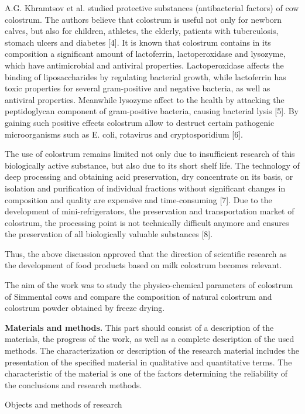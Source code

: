 A.G. Khramtsov et al. studied protective substances (antibacterial
factors) of cow colostrum. The authors believe that colostrum is useful
not only for newborn calves, but also for children, athletes, the
elderly, patients with tuberculosis, stomach ulcers and diabetes
{[}4{]}. It is known that colostrum contains in its composition a
significant amount of lactoferrin, lactoperoxidase and lysozyme, which
have antimicrobial and antiviral properties. Lactoperoxidase affects the
binding of liposaccharides by regulating bacterial growth, while
lactoferrin has toxic properties for several gram-positive and negative
bacteria, as well as antiviral properties. Meanwhile lysozyme affect to
the health by attacking the peptidoglycan component of gram-positive
bacteria, causing bacterial lysis {[}5{]}. By gaining such positive
effects colostrum allow to destruct certain pathogenic microorganisms
such as E. coli, rotavirus and cryptosporidium {[}6{]}.

The use of colostrum remains limited not only due to insufficient
research of this biologically active substance, but also due to its
short shelf life. The technology of deep processing and obtaining acid
preservation, dry concentrate on its basis, or isolation and
purification of individual fractions without significant changes in
composition and quality are expensive and time-consuming {[}7{]}. Due to
the development of mini-refrigerators, the preservation and
transportation market of colostrum, the processing point is not
technically difficult anymore and ensures the preservation of all
biologically valuable substances {[}8{]}.

Thus, the above discussion approved that the direction of scientific
research as the development of food products based on milk colostrum
becomes relevant.

The aim of the work was to study the physico-chemical parameters of
colostrum of Simmental cows and compare the composition of natural
colostrum and colostrum powder obtained by freeze drying.

{\bfseries Materials and methods.} This part should consist of a
description of the materials, the progress of the work, as well as a
complete description of the used methods. The characterization or
description of the research material includes the presentation of the
specified material in qualitative and quantitative terms. The
characteristic of the material is one of the factors determining the
reliability of the conclusions and research methods.

Objects and methods of research

